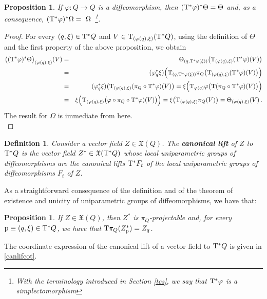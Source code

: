 \documentclass[12pt]{report}
\newtheorem{prop}[teor]{Proposition}
\newtheorem{definition}[teor]{Definition}
\def\beann{\begin{eqnarray*}}
\def\eeann{\end{eqnarray*}}
\def\qed{\ifvmode\removelastskip\fi
{\unskip\nobreak\hfil\penalty50\hbox{}\nobreak\hfil
\hbox{\vrule height1.2ex width1.2ex}\parfillskip=0pt
\finalhyphendemerits=0 \par\smallskip}}
\def\vf{\mathfrak X}
\def\Tan{{\rm T}}
\begin{document}
\begin{appendix}
\begin{prop}
If $\varphi\colon Q\to Q$ is a diffeomorphism,
then $(\Tan^*\varphi)^*\Theta =\Theta$ and,
as a consequence,
$(\Tan^*\varphi)^*\Omega =~\Omega$~\footnote{
With the terminology introduced in Section \ref{tcs},
we say that $\Tan^*\varphi$ is a {\sl simplectomorphism}}.
\label{levdif}
\end{prop}
\begin{proof}
For every $(q,\xi)\in\Tan^*Q$ and
$V\in\Tan_{(\varphi(q),\xi)}(\Tan^*Q)$,
using the definition of $\Theta$ and the first property of the above proposition, we obtain
\beann
\big((\Tan^*\varphi)^*\Theta\big)_{(\varphi(q),\xi)}(V) &=&
\Theta_{(q,\Tan^*\varphi(\xi))}\big(\Tan_{(\varphi(q),\xi)}(\Tan^*\varphi) (V)\big)
\\ &=&
(\varphi_q^*\xi)\Big(\Tan_{(q,\Tan^*\varphi(\xi))}\pi_Q \big(\Tan_{(\varphi(q),\xi)}(\Tan^*\varphi)(V)\big)\Big)
\\ &=&
(\varphi_q^*\xi)\big(\Tan_{(\varphi(q),\xi)}(\pi_Q\circ\Tan^*\varphi)(V)\big)=
\xi\Big(\Tan_{\varphi(q)}\varphi\big(\Tan(\pi_Q\circ\Tan^*\varphi)(V)\big)\Big)
\\ &=&
\xi\Big(\Tan_{(\varphi(q),\xi)} \big(\varphi\circ\pi_Q\circ\Tan^*\varphi)(V)\big)\Big)=
\xi\big(\Tan_{(\varphi(q),\xi)}\pi_Q(V)\big)=
\Theta_{(\varphi(q),\xi)}(V) \, .
\eeann
The result for $\Omega$ is immediate from here.
\\ \qed  \end{proof}

\begin{definition}
Consider a vector field $Z\in\vf (Q)$.
The \textbf{canonical lift} of $Z$ to $\Tan^*Q$
is the vector field $Z^*\in\vf (\Tan^*Q)$
whose local uniparametric groups of diffeomorphisms
are the canonical lifts $\Tan^* F_t$
of the local uniparametric groups of diffeomorphisms
$ F_t$ of $Z$.
\end{definition}

As a straightforward consequence of the definition and of the
theorem of existence and unicity of uniparametric groups
of diffeomorphisms, we have that:

\begin{prop}
If $Z\in\vf (Q)$, then $Z^*$ is $\pi_Q$-projectable and, 
for every ${\rm p}\equiv (q,\xi)\in\Tan^*Q$,
we have that $\Tan\pi_Q (Z^*_{\rm p})=Z_q$.
\label{prolevcan}
\end{prop}

The coordinate expression of the canonical lift of a vector field to $\Tan^*Q$ is given in \eqref{canlifcot}.


\end{appendix}
\end{document}
